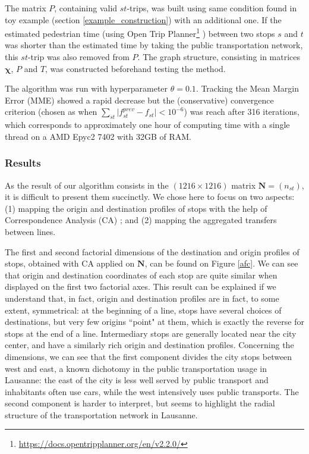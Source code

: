 \documentclass{bmcart}
\begin{document}
The matrix $P$, containing valid $st$-trips, was built using same condition found in toy example (section \ref{example_construction}) with an additional one. If the estimated pedestrian time (using Open Trip Planner\footnote{\url{https://docs.opentripplanner.org/en/v2.2.0/}} \cite{MalcolmMorgan2019}) between two stops $s$ and $t$ was shorter than the estimated time by taking the public transportation network, this $st$-trip was also removed from $P$. The graph structure, consisting in matrices $\bm{\chi}$, $P$ and $T$, was constructed beforehand testing the method.

The algorithm was run with hyperparameter $\theta = 0.1$. Tracking the Mean Margin Error (MME) showed a rapid decrease but the (conservative) convergence criterion (chosen as when $\sum_{st} \vert f^{prev}_{st} - f_{st} \vert< 10^{-6} $) was reach after 316 iterations, which corresponds to approximately one hour of computing time with a single thread on a AMD Epyc2 7402 with 32GB of RAM.

\subsubsection{Results}
\label{real_results}

As the result of our algorithm consists in the $(1216 \times 1216)$ matrix $\mathbf{N} = (n_{st})$, it is difficult to present them succinctly. We chose here to focus on two aspects: (1) mapping the origin and destination profiles of stops with the help of Correspondence Analysis (CA) \cite{benzecri1977histoire}; and (2) mapping the aggregated transfers between lines.

The first and second factorial dimensions of the destination and origin profiles of stops, obtained with CA applied on $\mathbf{N}$, can be found on Figure \ref{afc}. We can see that origin and destination coordinates of each stop are quite similar when displayed on the first two factorial axes. This result can be explained if we understand that, in fact, origin and destination profiles are in fact, to some extent, symmetrical: at the beginning of a line, stops have several choices of destinations, but very few origins ``point" at them, which is exactly the reverse for stops at the end of a line. Intermediary stops are generally located near the city center, and have a similarly rich origin and destination profiles. Concerning the dimensions, we can see that the first component divides the city stops between west and east, a known dichotomy in the public transportation usage in Lausanne: the east of the city is less well served by public transport and inhabitants often use cars, while the west intensively uses public transports. The second component is harder to interpret, but seems to highlight the radial structure of the transportation network in Lausanne.
\end{document}
